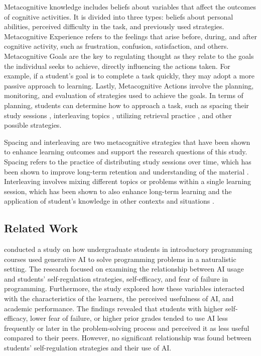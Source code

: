 \documentclass[sn-apa]{sn-jnl} %
\begin{document}
Metacognitive knowledge includes beliefs about variables that affect the
outcomes of cognitive activities. It is divided into three types: beliefs about
personal abilities, perceived difficulty in the task, and previously used
strategies. Metacognitive Experience refers to the feelings that arise before,
during, and after cognitive activity, such as frustration, confusion,
satisfaction, and others. Metacognitive Goals are the key to regulating thought
as they relate to the goals the individual seeks to achieve, directly
influencing the actions taken. For example, if a student’s goal is to complete
a task quickly, they may adopt a more passive approach to learning. Lastly,
Metacognitive Actions involve the planning, monitoring, and evaluation of
strategies used to achieve the goals. In terms of planning, students can
determine how to approach a task, such as spacing their study sessions
\citep{Carvalho20}, interleaving topics \citep{Rivers21}, utilizing
retrieval practice \citep{larsen18}, and other possible strategies.

Spacing and interleaving are two metacognitive strategies that have been shown
to enhance learning outcomes and support the research questions of this study.
Spacing refers to the practice of distributing study sessions over time, which
has been shown to improve long-term retention and understanding of the material
\citep{Carvalho20}. Interleaving involves mixing different topics or problems
within a single learning session, which has been shown to also enhance long-term
learning and the application of student's knowledge in other contexts and
situations \citep{Rivers21}.

\subsection{Related Work}

\cite{Margulieux24} conducted a study on how undergraduate students in
introductory programming courses used generative AI to solve programming
problems in a naturalistic setting. The research focused on examining the
relationship between AI usage and students’ self-regulation strategies,
self-efficacy, and fear of failure in programming. Furthermore, the study
explored how these variables interacted with the characteristics of the learners,
the perceived usefulness of AI, and academic performance. The findings revealed
that students with higher self-efficacy, lower fear of failure, or higher prior
grades tended to use AI less frequently or later in the problem-solving process
and perceived it as less useful compared to their peers. However, no significant
relationship was found between students’ self-regulation strategies and their
use of AI.
\end{document}
